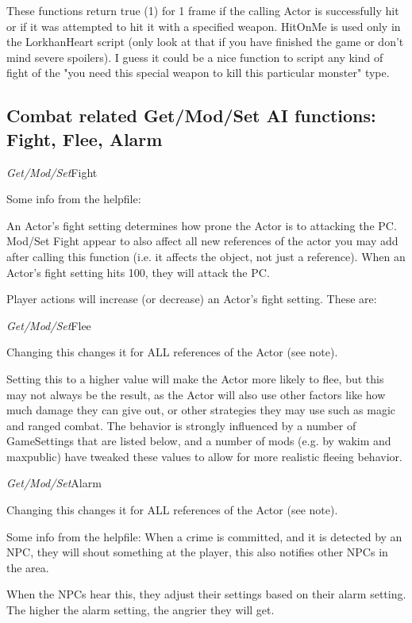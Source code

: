 These functions return true (1) for 1 frame if the calling Actor is
successfully hit or if it was attempted to hit it with a specified
weapon. HitOnMe is used only in the LorkhanHeart script (only look at
that if you have finished the game or don't mind severe spoilers). I
guess it could be a nice function to script any kind of fight of the
"you need this special weapon to kill this particular monster" type.

\hypertarget{combat-related-getmodset-ai-functions-fight-flee-alarm}{%
\subsection{Combat related Get/Mod/Set AI functions: Fight, Flee,
Alarm}\label{combat-related-getmodset-ai-functions-fight-flee-alarm}}

\emph{Get/Mod/Set}Fight

Some info from the helpfile:

An Actor's fight setting determines how prone the Actor is to attacking
the PC. Mod/Set Fight appear to also affect all new references of the
actor you may add after calling this function (i.e. it affects the
object, not just a reference). When an Actor's fight setting hits 100,
they will attack the PC.

Player actions will increase (or decrease) an Actor's fight setting.
These are:

\emph{Get/Mod/Set}Flee

Changing this changes it for ALL references of the Actor (see note).

Setting this to a higher value will make the Actor more likely to flee,
but this may not always be the result, as the Actor will also use other
factors like how much damage they can give out, or other strategies they
may use such as magic and ranged combat. The behavior is strongly
influenced by a number of GameSettings that are listed below, and a
number of mods (e.g. by wakim and maxpublic) have tweaked these values
to allow for more realistic fleeing behavior.

\emph{Get/Mod/Set}Alarm

Changing this changes it for ALL references of the Actor (see note).

Some info from the helpfile: When a crime is committed, and it is
detected by an NPC, they will shout something at the player, this also
notifies other NPCs in the area.

When the NPCs hear this, they adjust their settings based on their alarm
setting. The higher the alarm setting, the angrier they will get.

